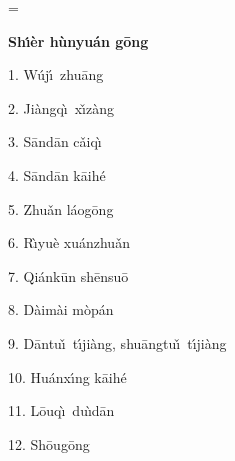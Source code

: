 \magnification=
\nopagenumbers
\parindent=0pt

\centerline{\bf Sh\'\i\`er h\`unyu\'an g\=ong}
\bigskip

1. W\'uj\'\i\ zhu\=ang
\medskip

2. Ji\`angq\`\i\ x\v{\i}z\`ang
\medskip

3. S\=and\=an c\v{a}iq\`\i
\medskip

4. S\=and\=an k\=aih\'e
\medskip

5. Zhu\v{a}n l\'aog\=ong
\medskip

6. R\`{\i}yu\`e xu\'anzhu\v{a}n
\medskip

7. Qi\'ank\=un sh\=ensu\=o
\medskip

8. D\`aim\`ai m\`op\'an
\medskip

9. D\=antu\v\i\ t\'{\i}ji\`ang, shu\=angtu\v\i\ t\'{\i}ji\`ang
\medskip

10. Hu\'anx\'{\i}ng k\=aih\'e
\medskip

11. L\=ouq\`\i\ du\`{\i}d\=an
\medskip

12. Sh\=oug\=ong

\bye
